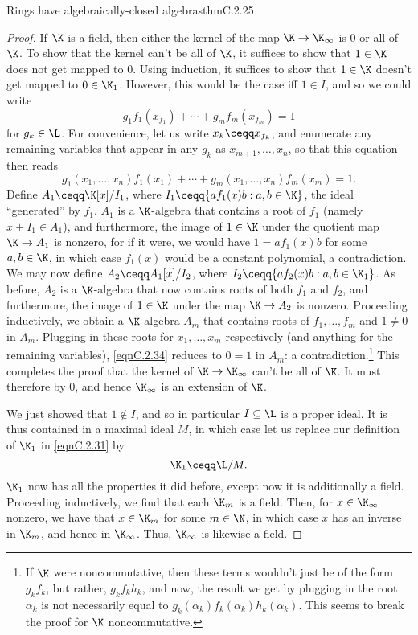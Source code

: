 \begin{thm}{Rings have algebraically-closed algebras}{thmC.2.25}
\begin{proof}
		If $\K$ is a field, then either the kernel of the map $\K \rightarrow \K _{\infty}$ is $0$ or all of $\K$.  To show that the kernel can't be all of $\K$, it suffices to show that $1\in \K$ does not get mapped to $0$.  Using induction, it suffices to show that $1\in \K$ doesn't get mapped to $0\in \K _1$.  However, this would be the case iff $1\in I$, and so we could write
		\begin{equation}
			g_1f_1(x_{f_1})+\cdots +g_mf_m(x_{f_m})=1
		\end{equation}
		for $g_k\in \L$.  For convenience, let us write $x_k\ceqq x_{f_k}$, and enumerate any remaining variables that appear in any $g_k$ as $x_{m+1},\ldots ,x_n$, so that this equation then reads
		\begin{equation}\label{eqnC.2.34}
			g_1(x_1,\ldots ,x_n)f_1(x_1)+\cdots +g_m(x_1,\ldots ,x_n)f_m(x_m)=1.
		\end{equation}
		Define $A_1\ceqq \K [x]/I_1$, where $I_1\ceqq \{ af_1(x)b:a,b\in \K \}$, the ideal ``generated'' by $f_1$.  $A_1$ is a $\K$-algebra that contains a root of $f_1$ (namely $x+I_1\in A_1$), and furthermore, the image of $1\in \K$ under the quotient map $\K \rightarrow A_1$ is nonzero, for if it were, we would have $1=af_1(x)b$ for some $a,b\in \K$, in which case $f_1(x)$ would be a constant polynomial, a contradiction.  We may now define $A_2\ceqq A_1[x]/I_2$, where $I_2\ceqq \{ af_2(x)b:a,b\in \K _1\}$.  As before, $A_2$ is a $\K$-algebra that now contains roots of both $f_1$ and $f_2$, and furthermore, the image of $1\in \K$ under the map $\K \rightarrow A_2$ is nonzero.  Proceeding inductively, we obtain a $\K$-algebra $A_m$ that contains roots of $f_1,\ldots ,f_m$ and $1\neq 0$ in $A_m$.  Plugging in these roots for $x_1,\ldots ,x_m$ respectively (and anything for the remaining variables), \eqref{eqnC.2.34} reduces to $0=1$ in $A_m$:  a contradiction.\footnote{If $\K$ were noncommutative, then these terms wouldn't just be of the form $g_kf_k$, but rather, $g_kf_kh_k$, and now, the result we get by plugging in the root $\alpha _k$ is not necessarily equal to $g_k(\alpha _k)f_k(\alpha _k)h_k(\alpha _k)$.  This seems to break the proof for $\K$ noncommutative.}  This completes the proof that the kernel of $\K \rightarrow \K _{\infty}$ can't be all of $\K$.  It must therefore by $0$, and hence $\K _{\infty}$ is an extension of $\K$.
		
		We just showed that $1\notin I$, and so in particular $I\subseteq \L$ is a proper ideal.  It is thus contained in a maximal ideal $M$, in which case let us replace our definition of $\K _1$ in \eqref{eqnC.2.31} by
		\begin{equation}
			\K _1\ceqq \L /M.
		\end{equation}
		$\K _1$ now has all the properties it did before, except now it is additionally a field.  Proceeding inductively, we find that each $\K _m$ is a field.  Then, for $x\in \K _{\infty}$ nonzero, we have that $x\in \K _m$ for some $m\in \N$, in which case $x$ has an inverse in $\K _m$, and hence in $\K _{\infty}$.  Thus, $\K _{\infty}$ is likewise a field.
	\end{proof}
\end{thm}
